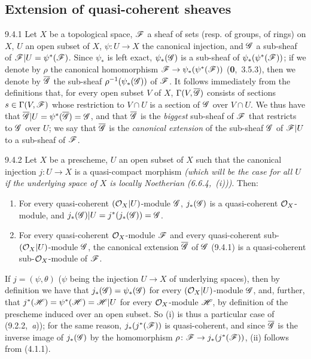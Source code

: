 \documentclass[../main.tex]{subfiles}
\begin{document}
\subsection{Extension of quasi-coherent sheaves}

\begin{cx}{9.4.1}
    Let $X$ be a topological space, $\mathscr{F}$ a sheaf of sets (resp. of groups, of rings) on $X$, $U$ an open subset of $X$, $\psi\colon U\to X$ the canonical injection, and $\mathscr{G}$ a sub-sheaf of $\mathscr{F}|U=\psi^*(\mathscr{F})$.
    Since $\psi_*$ is left exact, $\psi_*(\mathscr{G})$ is a sub-sheaf of $\psi_*(\psi^*(\mathscr{F}))$; if we denote by $\rho$ the canonical homomorphism $\mathscr{F}\to\psi_*(\psi^*(\mathscr{F}))$ (\textbf{0},~3.5.3), then we denote by $\overline{\mathscr{G}}$ the sub-sheaf $\rho^{-1}(\psi_*(\mathscr{G}))$ of $\mathscr{F}$.
    It follows immediately from the definitions that, for every open subset $V$ of $X$, $\Gamma(V,\overline{\mathscr{G}})$ consists of sections $s\in\Gamma(V,\mathscr{F})$ whose restriction to $V\cap U$ is a section of $\mathscr{G}$ over $V\cap U$.
    We thus have that $\overline{\mathscr{G}}|U=\psi^*(\overline{\mathscr{G}})=\mathscr{G}$, and that $\overline{\mathscr{G}}$ is the \emph{biggest} sub-sheaf of $\mathscr{F}$ that restricts to $\mathscr{G}$ over $U$; we say that $\overline{\mathscr{G}}$ is the \emph{canonical extension} of the sub-sheaf $\mathscr{G}$ of $\mathscr{F}|U$ to a sub-sheaf of $\mathscr{F}$.
\end{cx}

\begin{cx}[Proposition]{9.4.2}
    Let $X$ be a prescheme, $U$ an open subset of $X$ such that the canonical injection $j\colon U\to X$ is a quasi-compact morphism \emph{(which will be the case for \emph{all} $U$ if the underlying space of $X$ is \emph{locally Noetherian} {\normalfont(6.6.4,~(i))})}.
    Then:
    \begin{enumerate}[label=\normalfont(\roman*)]
        \item For every quasi-coherent $(\mathcal{O}_X|U)$-module $\mathscr{G}$, $j_*(\mathscr{G})$ is a quasi-coherent $\mathcal{O}_X$-module, and $j_*(\mathscr{G})|U=j^*(j_*(\mathscr{G}))=\mathscr{G}$.
        \item For every quasi-coherent $\mathcal{O}_X$-module $\mathscr{F}$ and every quasi-coherent sub-$(\mathcal{O}_X|U)$-module $\mathscr{G}$, the canonical extension $\overline{\mathscr{G}}$ of $\mathscr{G}$ {\normalfont(9.4.1)} is a quasi-coherent sub-$\mathcal{O}_X$-module of $\mathscr{F}$.
    \end{enumerate}
\end{cx}

If $j=(\psi,\theta)$ ($\psi$ being the injection $U\to X$ of underlying spaces), then by definition we have that $j_*(\mathscr{G})=\psi_*(\mathscr{G})$ for every $(\mathcal{O}_X|U)$-module $\mathscr{G}$, and, further, that $j^*(\mathscr{H})=\psi^*(\mathscr{H})=\mathscr{H}|U$ for every $\mathcal{O}_X$-module $\mathscr{H}$, by definition of the prescheme induced over an open subset.
So (i) is thus a particular case of (9.2.2,~\emph{a})); for the same reason, $j_*(j^*(\mathscr{F}))$ is quasi-coherent, and since $\overline{\mathscr{G}}$ is the inverse image of $j_*(\mathscr{G})$ by the homomorphism $\rho\colon\mathscr{F}\to j_*(j^*(\mathscr{F}))$, (ii) follows from (4.1.1).
\end{document}
